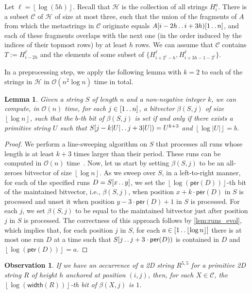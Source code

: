 \documentclass[11pt,letterpaper]{article}
\newcommand{\cO}{\mathcal{O}}
\newcommand{\floor}[1]{\left\lfloor #1 \right\rfloor}
\newcommand{\width}{\textsf{width}}
\def\dd{\mathinner{.\,.}}
\newcommand{\C}{\mathcal{C}}
\newcommand{\hmeta}[2]{H_{#1}^{#2}}
\newcommand{\per}{\textsf{per}}
\newtheorem{observation}[theorem]{Observation}
\newtheorem{lemma}[theorem]{Lemma}
\begin{document}
Let $\ell=\floor{\log (5h)}$.
Recall that $\mathcal{H}$ is the collection of all strings $\hmeta{i}{a}$.
There is a subset $\mathcal{C}$ of $\mathcal{H}$ of size at most three, such that the union of the fragments of $A$ from which the metastrings in $\C$ originate equals $A[i-2h \dd i+3h)[1 \dd n]$, and each of these fragments overlaps with the next one (in the order induced by the indices of their topmost rows) by at least $h$ rows.
We can assume that $\mathcal{C}$ contains $T:=\hmeta{i-2h}{\ell}$ and the elements of some subset of $\{\hmeta{i+2^{\ell}-h}{\ell}, \hmeta{i+3h-1-2^{\ell}}{\ell}\}$.

In a preprocessing step, we apply the following lemma with $k=2$ to each of the strings in $\mathcal{H}$ in $\cO(n^2 \log n)$ time in total.
\begin{lemma}\label{lem:bit_runs}
Given a string $S$ of length $n$ and a non-negative integer $k$, we can compute, in $\cO(n)$ time, for each $j \in [1 \dd n]$, a bitvector $\beta(S,j)$ of size $\floor{\log n}$, such that the $b$-th bit of $\beta(S,j)$ is set if and only if there exists a primitive string $U$ such that $S[j-k|U| \dd j+3|U|)=U^{k+3}$ and $\floor{\log |U|}=b$.
\end{lemma}
\begin{proof}
We perform a line-sweeping algorithm on $S$ that processes all runs whose length is at least $k+3$ times larger than their period.
These runs can be computed in $\cO(n)$ time~\cite{KK:99,runstheorem}.
Now, let us start by setting $\beta(S,j)$ to be an all-zeroes bitvector of size $\floor{\log n}$.
As we sweep over $S$, in a left-to-right manner, for each of the specified runs $D=S[x \dd y]$, we set the $\floor{\log(\per(D))}$-th bit of the maintained bitvector, i.e., $\beta(S,j)$, when position $x+k\cdot\per(D)$ in $S$ is processed and unset it when position $y-3\cdot \per(D)+1$ in $S$ is processed.
For each $j$, we set $\beta(S,j)$ to be equal to the maintained bitvector just after position $j$ in $S$ is processed.
The correctness of this approach follows by \cref{lem:runs_evol}, which implies that, for each position $j$ in $S$, for each $a \in [1 \dd \floor{\log n}]$ there is at most one run $D$ at a time such that $S[j \dd j+3\cdot\per(D))$ is contained in $D$ and $\floor{\log(\per(D))}=a$.
\end{proof}

\begin{observation}\label{obs:bit}
If we have an occurrence of a 2D string $R^{5,5}$ for a primitive 2D string $R$ of height $h$ anchored at position $(i,j)$, then, for each $X \in \C$, the $\floor{\log(\width(R))}$-th bit of $\beta(X,j)$ is $1$.
\end{observation}
\end{document}
